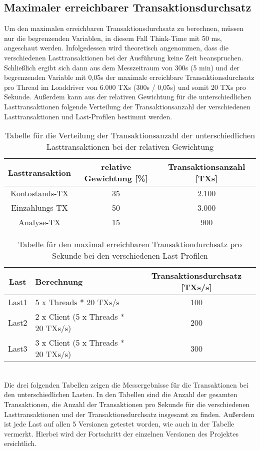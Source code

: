 \subsection{Maximaler erreichbarer Transaktionsdurchsatz}\label{subsec:maximaler-erreichbarer-transaktionsdurchsatz}
Um den maximalen erreichbaren Transaktionsdurchsatz zu berechnen, müssen nur die begrenzenden Variablen, in diesem Fall Think-Time mit 50 ms, angeschaut werden.
Infolgedessen wird theoretisch angenommen, dass die verschiedenen Lasttransaktionen bei der Ausführung keine Zeit beanspruchen.
Schließlich ergibt sich dann aus dem Messzeitraum von 300s (5 min) und der begrenzenden Variable mit 0,05s der maximale erreichbare Transaktionsdurchsatz pro Thread im Loaddriver von 6.000 TXs (300s / 0,05s) und somit 20 TXs pro Sekunde.
Außerdem kann aus der relativen Gewichtung für die unterschiedlichen Lasttransaktionen folgende Verteilung der Transaktionsanzahl der verschiedenen Lasttransaktionen und Last-Profilen bestimmt werden.
\begin{table}[h!]
    \centering
    \begin{tabular}{|c|c|c|}
        \hline
        Lasttransaktion & relative Gewichtung [\%] & Transaktionsanzahl [TXs] \\  \hline
        Kontostands-TX & 35 & 2.100 \\ \hline
        Einzahlungs-TX & 50 & 3.000 \\ \hline
        Analyse-TX & 15 & 900 \\ \hline
    \end{tabular}
    \caption{Tabelle für die Verteilung der Transaktionsanzahl der unterschiedlichen Lasttransaktionen bei der relativen Gewichtung}
    \label{tab:1}
\end{table}
\begin{table}[h!]
    \centering
    \begin{tabular}{|c|l|c|}
        \hline
        Last & Berechnung & Transaktionsdurchsatz [TXs/s] \\  \hline
        Last1 & 5 x Threads * 20 TXs/s & 100 \\ \hline
        Last2 & 2 x Client (5 x Threads * 20 TXs/s) & 200 \\ \hline
        Last3 & 3 x Client (5 x Threads * 20 TXs/s) & 300 \\ \hline
    \end{tabular}
    \caption{Tabelle für den maximal erreichbaren Transaktiondurchsatz pro Sekunde bei den verschiedenen Last-Profilen}
    \label{tab:2}
\end{table} \\
Die drei folgenden Tabellen zeigen die Messergebnisse für die Transaktionen bei den unterschiedlichen Lasten.
In den Tabellen sind die Anzahl der gesamten Transaktionen, die Anzahl der Transaktionen pro Sekunde für die verschiedenen Lasttransaktionen und der Transaktionsdurchsatz insgesamt zu finden.
Außerdem ist jede Last auf allen 5 Versionen getestet worden, wie auch in der Tabelle vermerkt.
Hierbei wird der Fortschritt der einzelnen Versionen des Projektes ersichtlich.
